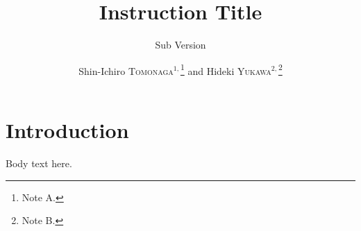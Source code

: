 \documentclass[seceq]{ptptex}
\title{Instruction Title}
\subtitle{Sub Version}
\author{Shin-Ichiro \textsc{Tomonaga}$^{1,}$\footnote{Note A.}
and Hideki \textsc{Yukawa}$^{2,}$\footnote{Note B.}}
\begin{document}
\maketitle
\section{Introduction}
Body text here.
\end{document}
